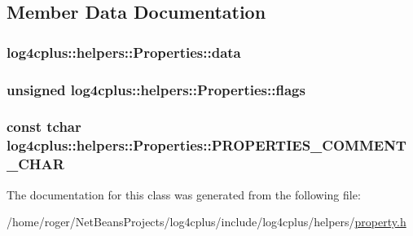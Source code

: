 \subsection{Member Data Documentation}
\hypertarget{classlog4cplus_1_1helpers_1_1Properties_a60cbb0e1ff347173db23c27d541da0b8}{
\subsubsection[{data}]{ log4cplus\-::helpers\-::\-Properties\-::data\hspace{0.3cm}{\ttfamily [protected]}}}\label{classlog4cplus_1_1helpers_1_1Properties_a60cbb0e1ff347173db23c27d541da0b8}
\hypertarget{classlog4cplus_1_1helpers_1_1Properties_a421e8c2c017bceb1f21d3811a9839b00}{
\subsubsection[{flags}]{\setlength{\rightskip}{0pt plus 5cm}unsigned log4cplus\-::helpers\-::\-Properties\-::flags\hspace{0.3cm}{\ttfamily [protected]}}}\label{classlog4cplus_1_1helpers_1_1Properties_a421e8c2c017bceb1f21d3811a9839b00}
\hypertarget{classlog4cplus_1_1helpers_1_1Properties_ad8750ca144fb7997867bf4d707993ba8}{
\subsubsection[{P\-R\-O\-P\-E\-R\-T\-I\-E\-S\-\_\-\-C\-O\-M\-M\-E\-N\-T\-\_\-\-C\-H\-A\-R}]{\setlength{\rightskip}{0pt plus 5cm}const {\bf tchar} log4cplus\-::helpers\-::\-Properties\-::\-P\-R\-O\-P\-E\-R\-T\-I\-E\-S\-\_\-\-C\-O\-M\-M\-E\-N\-T\-\_\-\-C\-H\-A\-R\hspace{0.3cm}{\ttfamily [static]}}}\label{classlog4cplus_1_1helpers_1_1Properties_ad8750ca144fb7997867bf4d707993ba8}


The documentation for this class was generated from the following file\-:\begin{DoxyCompactItemize}
\item 
/home/roger/\-Net\-Beans\-Projects/log4cplus/include/log4cplus/helpers/\hyperlink{property_8h}{property.\-h}\end{DoxyCompactItemize}
